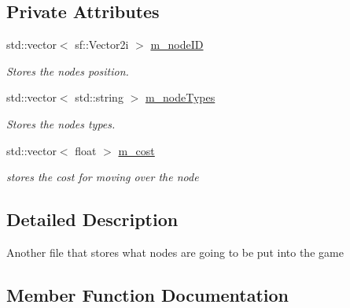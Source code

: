 \subsection*{Private Attributes}
\begin{DoxyCompactItemize}
\item 
\mbox{\label{class_file_reader_nodes_ac85d20778aba56dfed18856d1ebec542}} 
std\+::vector$<$ sf\+::\+Vector2i $>$ \mbox{\hyperlink{class_file_reader_nodes_ac85d20778aba56dfed18856d1ebec542}{m\+\_\+node\+ID}}
\begin{DoxyCompactList}\small\item\em Stores the nodes position. \end{DoxyCompactList}\item 
\mbox{\label{class_file_reader_nodes_ab07771dd9275e0c9e94a3db3d230d68b}} 
std\+::vector$<$ std\+::string $>$ \mbox{\hyperlink{class_file_reader_nodes_ab07771dd9275e0c9e94a3db3d230d68b}{m\+\_\+node\+Types}}
\begin{DoxyCompactList}\small\item\em Stores the nodes types. \end{DoxyCompactList}\item 
\mbox{\label{class_file_reader_nodes_a9aa3c874c878bf68bf387e3a54984253}} 
std\+::vector$<$ float $>$ \mbox{\hyperlink{class_file_reader_nodes_a9aa3c874c878bf68bf387e3a54984253}{m\+\_\+cost}}
\begin{DoxyCompactList}\small\item\em stores the cost for moving over the node \end{DoxyCompactList}\end{DoxyCompactItemize}


\subsection{Detailed Description}
Another file that stores what nodes are going to be put into the game 

\subsection{Member Function Documentation}
\mbox{\label{class_file_reader_nodes_a87231f197c15e2ef9e81e27cc9055276}} 
